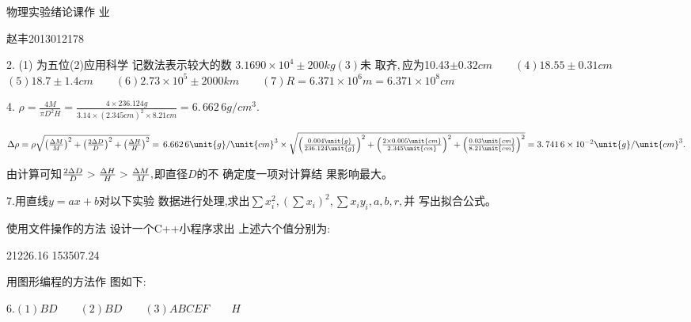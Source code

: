 \documentclass{article}
\begin{document}
\bigskip 物理实验绪论课作%
业

赵丰2013012178

2. (1) 为五位\qquad (2)应用科学%
记数法表示较大的数%
\qquad $3.1690\times 10^{4}\pm 200\unit{kg}$\qquad $\left( 3\right) $未%
取齐$,$应为10.43$\pm 0.32\unit{cm}\qquad \left(
4\right) 18.55\pm 0.31\unit{cm}$ \qquad $\left( 5\right) 18.7\pm 1.4\unit{cm}%
\qquad \left( 6\right) 2.73\times 10^{5}\pm 2000\unit{km}\qquad \left(
7\right) R=6.371\times 10^{6}\unit{m}=6.371\times 10^{8}\unit{cm}$

4. $\rho =\frac{4M}{\pi D^{2}H}=\frac{4\times 236.124\unit{g}}{3.14\times
\left( 2.345\unit{cm}\right) ^{2}\times 8.21\unit{cm}}=\allowbreak
6.\,\allowbreak 662\,6\unit{g}/\unit{cm}^{3}.$

$\Delta \rho =\rho \sqrt{\left( \frac{\Delta M}{M}\right) ^{2}+\left( \frac{%
2\Delta D}{D}\right) ^{2}+\left( \frac{\Delta H}{H}\right) ^{2}}%
=\,\allowbreak 6.662\,6\unit{g}/\unit{cm}^{3}\times \sqrt{\left( \frac{0.004%
\unit{g}}{236.124\unit{g}}\right) ^{2}+\left( \frac{2\times 0.005\unit{cm}}{%
2.345\unit{cm}}\right) ^{2}+\left( \frac{0.03\unit{cm}}{8.21\unit{cm}}%
\right) ^{2}}=3.\,\allowbreak 741\,6\times 10^{-2}\unit{g}/\unit{cm}^{3}.$

由计算可知\qquad $\frac{2\Delta D}{D}>\frac{%
\Delta H}{H}>\frac{\Delta M}{M},$即直径$D$的不%
确定度一项对计算结%
果影响最大。

7.用直线$y=ax+b$对以下实验%
数据进行处理,求出$\sum
x_{i}^{2},\left( \sum x_{i}\right) ^{2},\sum x_{i}y_{i},a,b,r,$并%
写出拟合公式。

使用文件操作的方法%
设计一个C++小程序求出%
上述六个值分别为:

21226.16 153507.24    

用图形编程的方法作%
图如下:


6.\qquad $\left( 1\right) BD\qquad \left( 2\right) BD\qquad \left( 3\right)
ABCEF\qquad H$
\end{document}
